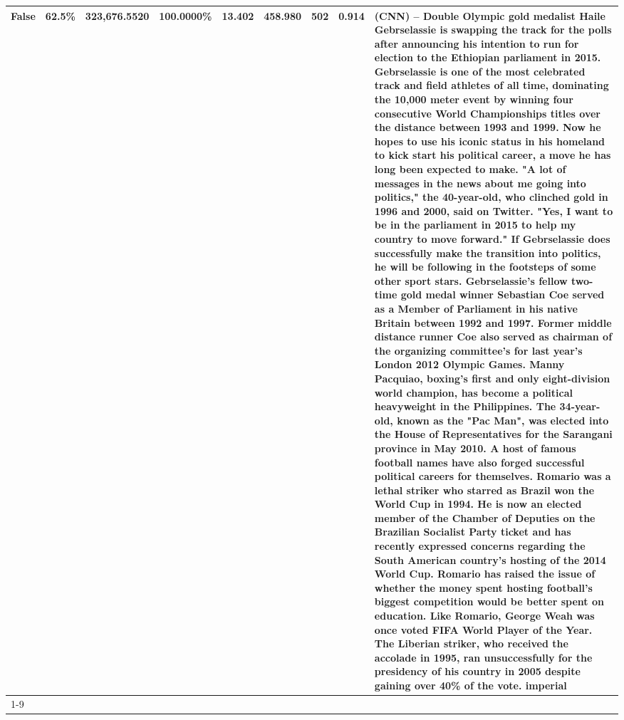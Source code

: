 \begin{table}[H]
{\begin{tabular}{lllrlllll}
False & 62.5\% & 323,676.5520 & \bfseries \color{red} 100.0000\% & 13.402 & 458.980 & 502 & 0.914 & (CNN) -- Double Olympic gold medalist Haile Gebrselassie is swapping the track for the polls after announcing his intention to run for election to the Ethiopian parliament in 2015. Gebrselassie is one of the most celebrated track and field athletes of all time, dominating the 10,000 meter event by winning four consecutive World Championships titles over the distance between 1993 and 1999. Now he hopes to use his iconic status in his homeland to kick start his political career, a move he has long been expected to make. "A lot of messages in the news about me going into politics," the 40-year-old, who clinched gold in 1996 and 2000, said on Twitter. "Yes, I want to be in the parliament in 2015 to help my country to move forward." If Gebrselassie does successfully make the transition into politics, he will be following in the footsteps of some other sport stars. Gebrselassie's fellow two-time gold medal winner Sebastian Coe served as a Member of Parliament in his native Britain between 1992 and 1997. Former middle distance runner Coe also served as chairman of the organizing committee's for last year's London 2012 Olympic Games. Manny Pacquiao, boxing's first and only eight-division world champion, has become a political heavyweight in the Philippines. The 34-year-old, known as the "Pac Man", was elected into the House of Representatives for the Sarangani province in May 2010. A host of famous football names have also forged successful political careers for themselves. Romario was a lethal striker who starred as Brazil won the World Cup in 1994. He is now an elected member of the Chamber of Deputies on the Brazilian Socialist Party ticket and has recently expressed concerns regarding the South American country's hosting of the 2014 World Cup. Romario has raised the issue of whether the money spent hosting football's biggest competition would be better spent on education. Like Romario, George Weah was once voted FIFA World Player of the Year. The Liberian striker, who received the accolade in 1995, ran unsuccessfully for the presidency of his country in 2005 despite gaining over 40\% of the vote. imperial \\
\cline{1-9}

\end{tabular}}
\end{table}
